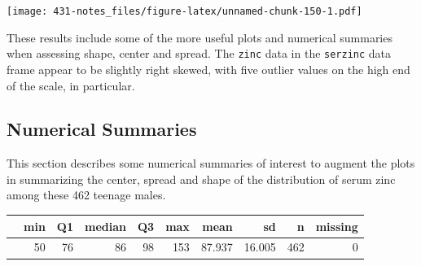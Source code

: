 \documentclass[
]{book}
\newenvironment{Shaded}{\begin{snugshade}}{\end{snugshade}}
\newcommand{\DataTypeTok}[1]{\textcolor[rgb]{0.13,0.29,0.53}{#1}}
\newcommand{\DecValTok}[1]{\textcolor[rgb]{0.00,0.00,0.81}{#1}}
\newcommand{\KeywordTok}[1]{\textcolor[rgb]{0.13,0.29,0.53}{\textbf{#1}}}
\newcommand{\NormalTok}[1]{#1}
\newcommand{\OperatorTok}[1]{\textcolor[rgb]{0.81,0.36,0.00}{\textbf{#1}}}
\newcommand{\StringTok}[1]{\textcolor[rgb]{0.31,0.60,0.02}{#1}}
\begin{document}
\texttt{[image: 431-notes\_files/figure-latex/unnamed-chunk-150-1.pdf]}

These results include some of the more useful plots and numerical summaries when assessing shape, center and spread. The \texttt{zinc} data in the \texttt{serzinc} data frame appear to be slightly right skewed, with five outlier values on the high end of the scale, in particular.

\hypertarget{numerical-summaries}{%
\subsection{Numerical Summaries}\label{numerical-summaries}}

This section describes some numerical summaries of interest to augment the plots in summarizing the center, spread and shape of the distribution of serum zinc among these 462 teenage males.

\begin{Shaded}
\end{Shaded}

\begin{tabular}{l|r|r|r|r|r|r|r|r|r}
\hline
  & min & Q1 & median & Q3 & max & mean & sd & n & missing\\
\hline
 & 50 & 76 & 86 & 98 & 153 & 87.937 & 16.005 & 462 & 0\\
\hline
\end{tabular}

\begin{Shaded}
\end{Shaded}
\end{document}
